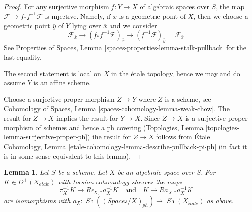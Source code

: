\documentclass{stacks-project}
\theoremstyle{plain}
\newtheorem{lemma}[subsection]{Lemma}
\theoremstyle{definition}
\theoremstyle{remark}
\numberwithin{equation}{subsection}
\def\Sh{\mathop{\mathit{Sh}}\nolimits}
\def\etale{{\acute{e}tale}}
\begin{document}
\begin{proof}
For any surjective morphism $f : Y \to X$ of algebraic spaces over $S$,
the map $\mathcal{F} \to f_*f^{-1}\mathcal{F}$ is injective.
Namely, if $\overline{x}$ is a geometric point of $X$, then we
choose a geometric point $\overline{y}$ of $Y$ lying over $\overline{x}$
and we consider
$$
\mathcal{F}_{\overline{x}} \to
(f_*f^{-1}\mathcal{F})_{\overline{x}} \to
(f^{-1}\mathcal{F})_{\overline{y}} = \mathcal{F}_{\overline{x}}
$$
See Properties of Spaces, Lemma \ref{spaces-properties-lemma-stalk-pullback}
for the last equality.

\medskip\noindent
The second statement is local on $X$ in the \'etale topology, hence we may
and do assume $Y$ is an affine scheme.

\medskip\noindent
Choose a surjective proper morphism $Z \to Y$ where $Z$ is a scheme, see
Cohomology of Spaces, Lemma \ref{spaces-cohomology-lemma-weak-chow}.
The result for $Z \to X$ implies the result for $Y \to X$.
Since $Z \to X$ is a surjective proper morphism of schemes
and hence a ph covering
(Topologies, Lemma \ref{topologies-lemma-surjective-proper-ph})
the result for $Z \to X$ follows from
\'Etale Cohomology, Lemma \ref{etale-cohomology-lemma-describe-pullback-pi-ph}
(in fact it is in some sense equivalent to this lemma).
\end{proof}

\begin{lemma}
\label{lemma-cohomological-descent-etale-ph}
Let $S$ be a scheme. Let $X$ be an algebraic space over $S$.
For $K \in D^+(X_\etale)$ with torsion cohomology sheaves the maps
$$
\pi_X^{-1}K \longrightarrow R\epsilon_{X, *}a_X^{-1}K
\quad\text{and}\quad
K \longrightarrow Ra_{X, *}a_X^{-1}K
$$
are isomorphisms with
$a_X : \Sh((\textit{Spaces}/X)_{ph}) \to \Sh(X_\etale)$ as above.
\end{lemma}
\end{document}
